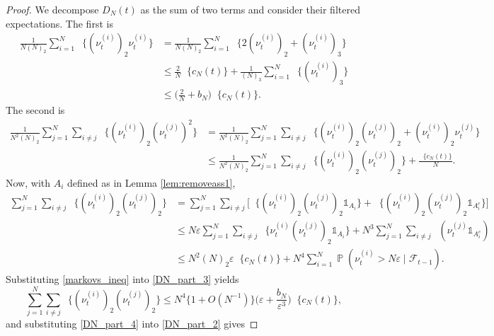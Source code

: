 \documentclass{article}
\theoremstyle{definition}
\DeclareMathOperator{\Prob}{\mathbb{P}}
\DeclareMathOperator{\Et}{\mathbb{E}_t}
\newcommand{\1}[1]{\mathbbm{1}_{\{#1\}}}
\begin{document}
\begin{proof}
We decompose $D_N(t)$ as the sum of two terms and consider their filtered expectations. The first is
\begin{align}
\frac{ 1 }{ N ( N )_2 } \sum_{ i = 1 }^N \Et\{ ( \nu_t^{(i)} )_2 \nu_t^{(i)}\} &= \frac{ 1 }{ N ( N )_2 } \sum_{ i = 1 }^N \Et\{2 ( \nu_t^{(i)} )_2 + ( \nu_t^{(i)} )_3\} \nonumber \\
&\leq \frac{ 2 }{ N } \Et\{ c_N( t )\} + \frac{ 1 }{ ( N )_3 } \sum_{ i = 1 }^N \Et\{ ( \nu_t^{(i)} )_3 \} \nonumber \\
&\leq \Bigg(\frac{ 2 }{ N } + b_N \Bigg) \Et\{ c_N( t ) \}. \label{DN_part_1}
\end{align}
The second is
\begin{align}
\frac{ 1 }{ N^2 ( N )_2 } \sum_{ j=1 }^N \sum_{ i \neq j } \Et\{ ( \nu_t^{(i)} )_2 ( \nu_t^{(j)} )^2\} &= \frac{ 1 }{ N^2 ( N )_2 } \sum_{ j=1 }^N \sum_{ i \neq j } \Et\{ ( \nu_t^{(i)} )_2 ( \nu_t^{(j)} )_2 + ( \nu_t^{(i)} )_2 \nu_t^{(j)} \} \nonumber \\
&\leq \frac{ 1 }{ N^2 ( N )_2 } \sum_{ j=1 }^N \sum_{ i \neq j } \Et\{ ( \nu_t^{(i)} )_2 ( \nu_t^{(j)} )_2 \} + \frac{ \Et\{ c_N( t ) \} }{ N }. \label{DN_part_2}
\end{align}
Now, with $A_i$ defined as in Lemma \ref{lem:removeass1},
\begin{align}
\sum_{ j=1 }^N \sum_{ i \neq j } \Et\{ ( \nu_t^{(i)} )_2 ( \nu_t^{(j)} )_2\} &= \sum_{ j=1 }^N \sum_{ i \neq j } \Big[ \Et\{ ( \nu_t^{(i)} )_2 ( \nu_t^{(j)} )_2 \mathds{ 1 }_{ A_i }\} + \Et\{ ( \nu_t^{(i)} )_2 ( \nu_t^{(j)} )_2 \mathds{ 1 }_{ A_i^c } \} \Big] \nonumber \\
&\leq N \varepsilon \sum_{ j=1 }^N \sum_{ i \neq j } \Et\{ \nu_t^{(i)} ( \nu_t^{(j)} )_2 \mathds{ 1 }_{ A_i } \} + N^3 \sum_{ j=1 }^N \sum_{ i \neq j } \Et( \nu_t^{(j)} \mathds{ 1 }_{ A_i^c } ) \nonumber \\
&\leq N^2 ( N )_2 \varepsilon \Et\{ c_N( t )\} + N^4 \sum_{ i = 1 }^N \Prob( \nu_t^{(i)} > N \varepsilon \mid \mathcal{F}_{t-1} ). \label{DN_part_3}
\end{align}
Substituting \eqref{markovs_ineq} into \eqref{DN_part_3} yields
\begin{equation}
\sum_{ j=1 }^N \sum_{ i \neq j } \Et\{ ( \nu_t^{(i)} )_2 ( \nu_t^{(j)} )_2 \} \leq N^4 \{ 1 + O( N^{ -1 } ) \} \Bigg( \varepsilon + \frac{ b_N }{ \varepsilon^3 } \Bigg) \Et\{ c_N( t ) \}, \label{DN_part_4}
\end{equation}
and substituting \eqref{DN_part_4} into \eqref{DN_part_2} gives

\end{proof}
\end{document}
